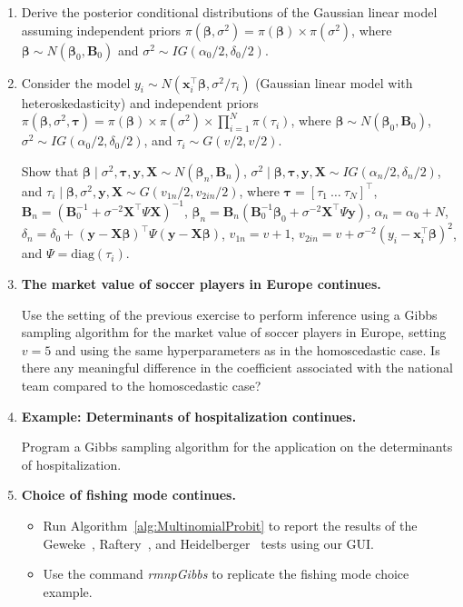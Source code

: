 \begin{enumerate}
	\item Derive the posterior conditional distributions of the Gaussian linear model assuming independent priors $\pi(\bm{\beta},\sigma^2)=\pi(\bm{\beta}) \times \pi(\sigma^2)$, where $\bm{\beta} \sim N(\bm{\beta}_0, {\bm{B}}_0)$ and $\sigma^2 \sim IG(\alpha_0/2, \delta_0/2)$.
	
	\item Consider the model $y_i \sim N({\bm{x}}_i^{\top}\bm{\beta}, \sigma^2/\tau_i)$ (Gaussian linear model with heteroskedasticity) and independent priors $\pi(\bm{\beta},\sigma^2,\bm{\tau}) = \pi(\bm{\beta}) \times \pi(\sigma^2) \times \prod_{i=1}^N \pi(\tau_i)$, where $\bm{\beta} \sim N(\bm{\beta}_0, {\bm{B}}_0)$, $\sigma^2 \sim IG(\alpha_0/2, \delta_0/2)$, and $\tau_i \sim G(v/2, v/2)$. 
	
	Show that $\bm{\beta}\mid \sigma^2,\bm{\tau},{\bm{y}},{\bm{X}}\sim N(\bm{\beta}_n,{\bm{B}}_n)$, $\sigma^2\mid \bm{\beta},\bm{\tau},{\bm{y}},{\bm{X}}\sim IG(\alpha_n/2,\delta_n/2)$, and $\tau_i\mid \bm{\beta},\sigma^2,{\bm{y}},{\bm{X}}\sim G(v_{1n}/2,v_{2in}/2)$, where $\bm{\tau}=[\tau_1 \ \dots \ \tau_N]^{\top}$, ${\bm{B}}_n=({\bm{B}}_0^{-1}+\sigma^{-2}{{\bm{X}}}^{\top}\Psi{{\bm{X}}})^{-1}$, $\bm{\beta}_n={\bm{B}}_n({\bm{B}}_0^{-1}\bm{\beta}_0+\sigma^{-2}{\bm{X}}^{\top}\Psi{\bm{y}})$, $\alpha_n=\alpha_0+N$, $\delta_n=\delta_0+({\bm{y}}-{\bm{X}}\bm{\beta})^{\top}\Psi({\bm{y}}-{\bm{X}}\bm{\beta})$, $v_{1n}=v+1$, $v_{2in}=v+\sigma^{-2}(y_i-{\bm{x}}_i^{\top}\bm{\beta})^2$, and $\Psi=\text{diag}\left(\tau_i\right)$.
	
	\item \textbf{The market value of soccer players in Europe continues.}  
	
	Use the setting of the previous exercise to perform inference using a Gibbs sampling algorithm for the market value of soccer players in Europe, setting $v=5$ and using the same hyperparameters as in the homoscedastic case. Is there any meaningful difference in the coefficient associated with the national team compared to the homoscedastic case?
	
	\item \textbf{Example: Determinants of hospitalization continues.}
	  
	Program a Gibbs sampling algorithm for the application on the determinants of hospitalization.
	
	\item \textbf{Choice of fishing mode continues.}  
	\begin{itemize}
		\item Run Algorithm~\ref{alg:MultinomialProbit} to report the results of the Geweke~\cite{Geweke1992}, Raftery~\cite{Raftery1992}, and Heidelberger~\cite{Heidelberger1983} tests using our GUI.
		\item Use the command \textit{rmnpGibbs} to replicate the fishing mode choice example.
	\end{itemize}
	

\end{enumerate}
